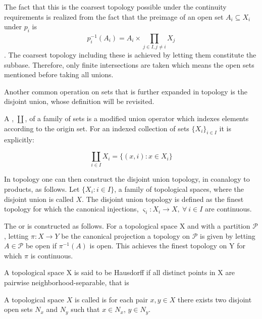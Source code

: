 \documentclass[../../main.tex]{subfiles}
\begin{document}
    The fact that this is the coarsest topology possible under the continuity requirements is realized from the fact that the preimage of an open set $A_i \subseteq X_i$ under $p_i$ is $$p_i^{-1}(A_i) = A_i \times \prod_{j \in I, j \ne i}^{}X_j$$. The coarsest topology including these is achieved by letting them constitute the subbase. Therefore, only finite intersections are taken which means the open sets mentioned before taking all unions.
    
    Another common operation on sets that is further expanded in topology is the disjoint union, whose definition will be revisited. 

    \begin{definition}
        A , $\coprod$, of a family of sets is a modified union operator which indexes elements according to the origin set. For an indexed collection of sets $\{X_i\}_{i \in I}$ it is explicitly:

        \begin{equation*}
            \coprod_{i \in I} X_i = \{(x, i): x \in X_i\}
        \end{equation*}
    \end{definition}
    
    In topology one can then construct the disjoint union topology, in coanalogy to products, as follows. Let $\{X_i : i \in I\}$, a family of topological spaces, where the disjoint union is called $X$. The disjoint union topology is defined as the finest topology for which the canonical injections, $\varsigma_i :X_i\to X, \: \forall\: i \in I$ are continuous.
    
    The  or  is constructed as follows. For a topological space X and with a partition $\mathcal{P}$, letting $\pi:X \to Y$ be the canonical projection a topology on $\mathcal{P}$ is given by letting $A \in \mathcal{P}$ be open if $\pi^{-1}(A)$ is open. This achieves the finest topology on Y for which $\pi$ is continuous.
    
    A topological space X is said to be Hausdorff if all distinct points in X are pairwise neighborhood-separable, that is
    
    \begin{definition}
        A topological space $X$ is called  is for each pair $x, y \in X$ there exists two disjoint open sets $N_x$ and $N_y$ such that $x \in N_x$, $y \in N_y$.
    \end{definition}
    
\end{document}
